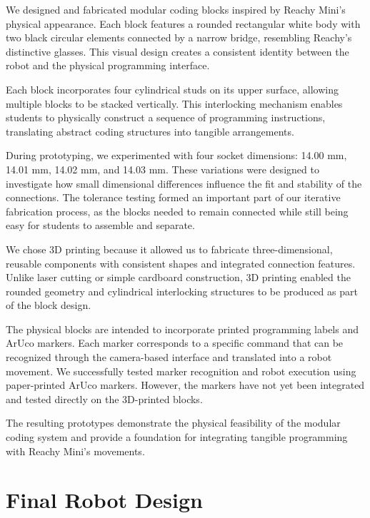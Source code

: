 \documentclass[conference]{IEEEtran}
\begin{document}
We designed and fabricated modular coding blocks inspired by Reachy Mini's physical appearance. Each block features a rounded rectangular white body with two black circular elements connected by a narrow bridge, resembling Reachy's distinctive glasses. This visual design creates a consistent identity between the robot and the physical programming interface.

Each block incorporates four cylindrical studs on its upper surface, allowing multiple blocks to be stacked vertically. This interlocking mechanism enables students to physically construct a sequence of programming instructions, translating abstract coding structures into tangible arrangements.

During prototyping, we experimented with four socket dimensions: 14.00 mm, 14.01 mm, 14.02 mm, and 14.03 mm. These variations were designed to investigate how small dimensional differences influence the fit and stability of the connections. The tolerance testing formed an important part of our iterative fabrication process, as the blocks needed to remain connected while still being easy for students to assemble and separate.

We chose 3D printing because it allowed us to fabricate three-dimensional, reusable components with consistent shapes and integrated connection features. Unlike laser cutting or simple cardboard construction, 3D printing enabled the rounded geometry and cylindrical interlocking structures to be produced as part of the block design.

The physical blocks are intended to incorporate printed programming labels and ArUco markers. Each marker corresponds to a specific command that can be recognized through the camera-based interface and translated into a robot movement. We successfully tested marker recognition and robot execution using paper-printed ArUco markers. However, the markers have not yet been integrated and tested directly on the 3D-printed blocks.

The resulting prototypes demonstrate the physical feasibility of the modular coding system and provide a foundation for integrating tangible programming with Reachy Mini's movements.





\section{Final Robot Design}
\end{document}
